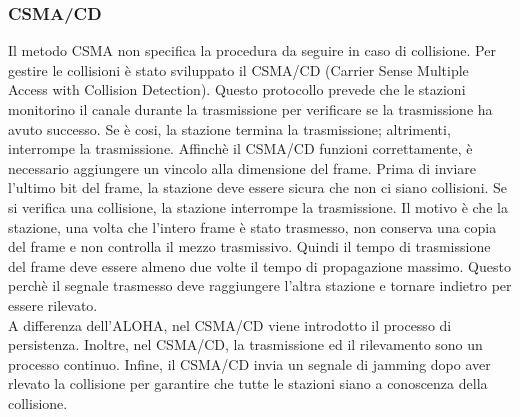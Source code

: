 \documentclass[12pt]{report}
\begin{document}
\subsubsection{CSMA/CD}
Il metodo CSMA non specifica la procedura da seguire in caso di collisione. Per gestire le collisioni è stato sviluppato il CSMA/CD (Carrier Sense Multiple Access with Collision Detection). Questo protocollo prevede che le stazioni monitorino il canale durante la trasmissione per verificare se la trasmissione ha avuto successo. Se è cosi, la stazione termina la trasmissione; altrimenti, interrompe la trasmissione. Affinchè il CSMA/CD funzioni correttamente, è necessario aggiungere un vincolo alla dimensione del frame. Prima di inviare l'ultimo bit del frame, la stazione deve essere sicura che non ci siano collisioni. Se si verifica una collisione, la stazione interrompe la trasmissione. Il motivo è che la stazione, una volta che l'intero frame è stato trasmesso, non conserva una copia del frame e non controlla il mezzo trasmissivo. Quindi il tempo di trasmissione del frame deve essere almeno due volte il tempo di propagazione massimo. Questo perchè il segnale trasmesso deve raggiungere l'altra stazione e tornare indietro per essere rilevato.
\vspace{\baselineskip}\\
A differenza dell'ALOHA, nel CSMA/CD viene introdotto il processo di persistenza. Inoltre, nel CSMA/CD, la trasmissione ed il rilevamento sono un processo continuo. Infine, il CSMA/CD invia un segnale di jamming dopo aver rlevato la collisione per garantire che tutte le stazioni siano a conoscenza della collisione.
\end{document}
